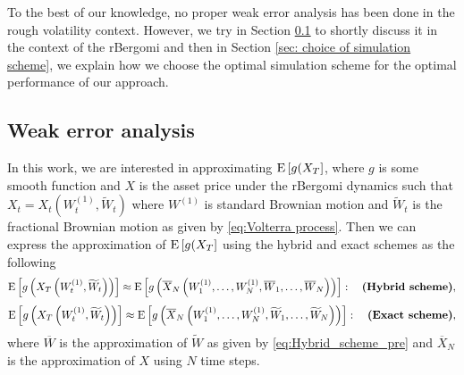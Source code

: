 To the best of our knowledge, no proper weak error
analysis has been done in the rough volatility context. However, we try in Section  \ref{sec:Weak error analysis} to shortly discuss it in the context of the rBergomi and then in Section \ref{sec: choice of simulation scheme}, we explain how we choose the optimal simulation scheme for the optimal performance of our approach.
\subsection{Weak error analysis}\label{sec:Weak error analysis}
In this work, we are interested in approximating $\mathrm{E}\left[g(X_T\right]$, where $g$ is some smooth function and $X$ is the asset price under the rBergomi dynamics such that $X_t=X_t(W^{(1)}_t,\widetilde{W}_t)$ where $W^{(1)}$ is standard Brownian motion and  $\widetilde{W}_t$ is the fractional Brownian motion as given by \eqref{eq:Volterra process}.  Then we can express the approximation of $\mathrm{E}\left[g(X_T\right]$  using the  hybrid and exact schemes as the following 
\begin{align*}
\mathrm{E}\left[g\left(X_T\left(W^{(1)}_t,\widetilde{W}_t \right)\right)\right] \approx \mathrm{E}\left[g\left(\overline{X}_N\left(W^{(1)}_1,\dots,W^{(1)}_N, \overline{W}_1, \dots,\overline{W}_N\right)\right)\right]:\quad \textbf{(Hybrid  scheme)},
\end{align*}
\begin{align*}
\mathrm{E}\left[g\left(X_T\left(W^{(1)}_t,\widetilde{W}_t\right)\right)\right] \approx \mathrm{E}\left[g\left(\overline{X}_N\left(W^{(1)}_1,\dots,W^{(1)}_N, \widetilde{W}_1, \dots,\widetilde{W}_N\right)\right)\right]:\quad \textbf{(Exact  scheme)},
\end{align*}
where $\overline{W}$ is the approximation of $\widetilde{W}$  as given by \eqref{eq:Hybrid_scheme_pre} and $\overline{X}_N$ is the approximation of $X$ using $N$ time steps.

